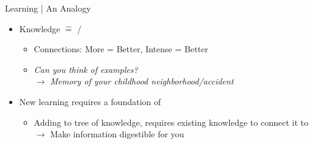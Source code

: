 \documentclass{ercisbeamer}
\begin{document}
\begin{frame}{Learning | An Analogy}
    \begin{tbox}
        \begin{itemize}
            \item Knowledge $\widehat =$   /  
            \begin{itemize}
                \item Connections: More = Better, Intense = Better
                \item \emph{Can you think of examples?} \pause \\ $\rightarrow$ \emph{Memory of your childhood neighborhood/accident}
            \end{itemize}
            \item New learning requires a foundation of 
            \begin{itemize}
                \item Adding to tree of knowledge, requires existing knowledge to connect it to \\ $\rightarrow$ Make information digestible for you
            \end{itemize}
        \end{itemize}
    \end{tbox}
\end{frame}
\setbgimage{}
\end{document}
